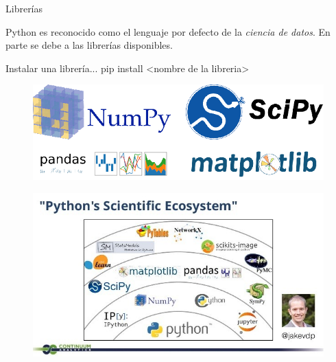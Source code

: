 \begin{frame}[allowframebreaks]{Librer\'ias}\vspace{10pt}

Python es reconocido como el lenguaje por defecto de la \textit{ciencia de datos}. En parte se debe a las librer\'ias disponibles.

\begin{block}{Instalar una librer\'ia...}
	pip install <nombre de la libreria>
\end{block}

\begin{figure}
	\includegraphics[scale=0.5]{Images/lib.png}
\end{figure}

\begin{figure}
	\includegraphics[scale=0.65]{Images/ecosystem.jpg}
\end{figure}

\end{frame}